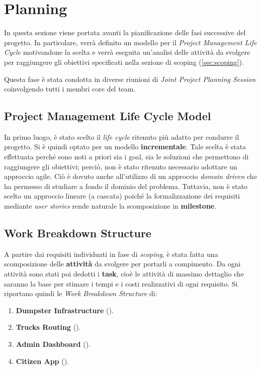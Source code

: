 \section{Planning}
\label{sec:planning}

In questa sezione viene portata avanti la pianificazione delle fasi successive del progetto. In particolare, verrà definito un modello per il \textit{Project Management Life Cycle} motivandone la scelta e verrà eseguita un'analisi delle attività da svolgere per raggiungere gli obiettivi specificati nella sezione di scoping (\ref{sec:scoping}).

Questa fase è stata condotta in diverse riunioni di \textit{Joint Project Planning Session} coinvolgendo tutti i membri core del team.

\subsection{Project Management Life Cycle Model}
In primo luogo, è stato scelto il \textit{life cycle} ritenuto più adatto per condurre il progetto. Si è quindi optato per un modello \textbf{incrementale}. Tale scelta è stata effettuata perché sono noti a priori sia i goal, sia le soluzioni che permettono di raggiungere gli obiettivi; perciò, non è stato ritenuto necessario adottare un approccio agile. Ciò è dovuto anche all'utilizzo di un approccio \textit{domain driven} che ha permesso di studiare a fondo il dominio del problema. Tuttavia, non è stato scelto un approccio lineare (a cascata) poiché la formalizzazione dei requisiti mediante \textit{user stories} rende naturale la scomposizione in \textbf{milestone}.

\subsection{Work Breakdown Structure}
A partire dai requisiti individuati in fase di \textit{scoping}, è stata fatta una scomposizione delle \textbf{attività} da svolgere per portarli a compimento. Da ogni attività sono stati poi dedotti i \textbf{task}, cioè le attività di massimo dettaglio che saranno la base per stimare i tempi e i costi realizzativi di ogni requisito.
Si riportano quindi le \textit{Work Breakdown Structure} di:
\begin{enumerate}
    \item \textbf{Dumpster Infrastructure} ().
    \item \textbf{Trucks Routing} ().
    \item \textbf{Admin Dashboard} ().
    \item \textbf{Citizen App} ().
\end{enumerate}